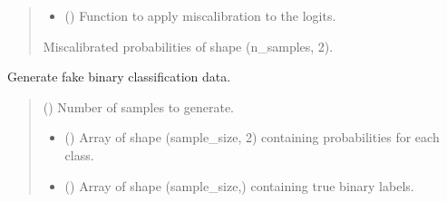 \documentclass[letterpaper,10pt,english]{sphinxmanual}
\begin{document}
\begin{fulllineitems}
\begin{fulllineitems}
\begin{quote}
\begin{description}
\begin{itemize}
\item {} 
\sphinxAtStartPar
{} () \textendash{} Function to apply miscalibration to the logits.

\end{itemize}

\sphinxAtStartPar
{} \textendash{} Miscalibrated probabilities of shape (n\_samples, 2).

\end{description}\end{quote}

\end{fulllineitems}


\begin{fulllineitems}
\label{\detokenize{calzone:calzone.utils.fake_binary_data_generator.generate_data}}
\pysigstartsignatures
{}
\pysigstopsignatures
\sphinxAtStartPar
Generate fake binary classification data.
\begin{quote}\begin{description}
\sphinxAtStartPar
{} () \textendash{} Number of samples to generate.

\begin{itemize}
\item {} 
\sphinxAtStartPar
{} () \textendash{} Array of shape (sample\_size, 2) containing probabilities for each class.

\item {} 
\sphinxAtStartPar
{} () \textendash{} Array of shape (sample\_size,) containing true binary labels.

\end{itemize}

\end{description}\end{quote}

\end{fulllineitems}


\end{fulllineitems}
\end{document}

